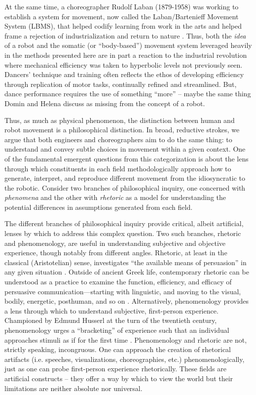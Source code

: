 \documentclass[arts,article,submit,moreauthors,pdftex,10pt,a4paper]{mdpi}
\begin{document}
At the same time, a choreographer Rudolf Laban (1879-1958) was working to establish a system for movement, now called the Laban/Bartenieff Movement System (LBMS), that helped codify learning from work in the arts and helped frame a rejection of industrialization and return to nature  \cite{bradley2008rudolf} .  Thus, both the \textit{idea} of a robot and the somatic (or ``body-based'') movement system leveraged heavily in the methods presented here are in part a reaction to the industrial revolution where mechanical efficiency was taken to hyperbolic levels not previously seen.  
Dancers’ technique and training often reflects the ethos of developing efficiency through replication of motor tasks, continually refined and streamlined. But, dance performance requires the use of something ``more'' -- maybe the same thing Domin and Helena discuss as missing from the concept of a robot.    

Thus, as much as physical phenomenon, the distinction between human and robot movement is a philosophical distinction.
In broad, reductive strokes, we argue that both engineers and choreographers aim to do the same thing:  to understand and convey subtle choices in movement within a given context. One of the fundamental emergent questions from this categorization is about the lens through which constituents in each field methodologically approach how to generate, interpret, and reproduce different movement from the idiosyncratic to the robotic.  %
Consider two branches of philosophical inquiry, one concerned with \textit{phenomena} and the other with \textit{rhetoric} as a model for understanding the potential differences in assumptions generated from each field. 

The different branches of philosophical inquiry provide critical, albeit artificial, lenses by which to address this complex question. Two such branches, rhetoric and phenomenology, are useful in understanding subjective and objective experience, though notably from different angles. Rhetoric, at least in the classical (Aristotelian) sense, investigates ``the available means of persuasion'' in any given situation \cite{kennedy2006rhetoric}. Outside of ancient Greek life, contemporary rhetoric can be understood as a practice to examine the function, efficiency, and efficacy of persuasive communication—starting with linguistic, and moving to the visual, bodily, energetic, posthuman, and so on \cite{barnett2016rhetoric}. Alternatively, phenomenology provides a lens through which to understand subjective, first-person experience. Championed by Edmund Husserl at the turn of the twentieth century, phenomenology urges a ``bracketing'' of experience such that an individual approaches stimuli as if for the first time \cite{husserl2012ideas}. Phenomenology and rhetoric are not, strictly speaking, incongruous. One can approach the creation of rhetorical artifacts (i.e. speeches, visualizations, choreographies, etc.) phenomenologically, just as one can probe first-person experience rhetorically.  These fields are artificial constructs -- they offer a way by which to view the world but their limitations are neither absolute nor universal.  \cite{hawhee2004bodily}  
\end{document}
